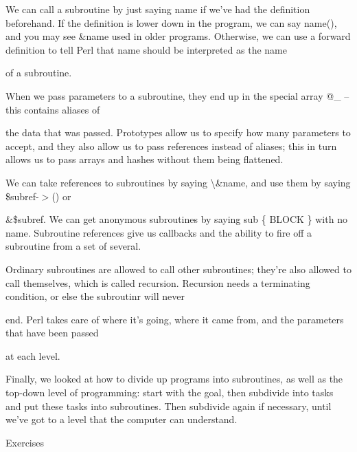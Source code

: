 \documentclass[a4paper,11pt]{book}
\begin{document}
\noindent 

\noindent We can call a subroutine by just saying name if we've had the definition beforehand. If the definition is lower down in the program,  we  can  say  name(),  and you  may  see \&name used  in  older  programs. Otherwise, we  can use a forward  definition  to  tell  Perl  that  name should  be  interpreted  as  the  name

\noindent of a subroutine.

\noindent 

\noindent 

\noindent When we pass parameters to a subroutine, they end up in the special array @\_ -- this contains aliases of

\noindent the data that was passed. Prototypes allow us to specify how many parameters to accept, and they also allow us to pass references instead of aliases; this in turn allows us to pass arrays and hashes without them being flattened.

\noindent 

\noindent We can take references to subroutines by saying \textbackslash \&name, and use them by saying \$subref-$>$() or

\noindent \&\$subref. We can get anonymous subroutines by saying sub \{ BLOCK \} with no name. Subroutine references give us callbacks and the ability to fire off a subroutine from a set of several.

\noindent 

\noindent Ordinary subroutines are allowed to call other subroutines; they're also allowed to call themselves, which is called recursion. Recursion needs a terminating condition, or else the subroutinr will never

\noindent end. Perl takes care of where it's going, where it came from, and the parameters that have been passed

\noindent at each level.

\noindent 

\noindent Finally, we looked at how to divide up programs into subroutines, as well as the top-down level of programming: start with the goal, then subdivide into tasks and put these tasks into subroutines. Then subdivide again if necessary, until we've got to a level that the computer can understand.

\noindent 

\noindent 

\noindent Exercises

\noindent 
\end{document}

